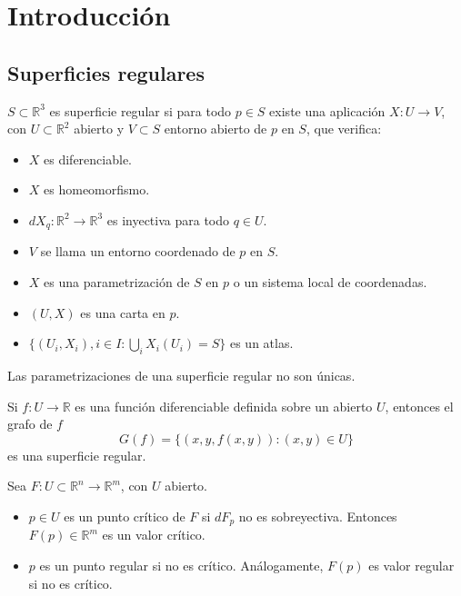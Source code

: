 \chapter{Introducción}
\section{Superficies regulares}

\begin{definition}
    $S \subset \mathbb{R}^3$ es superficie regular si para todo $p \in S$ existe una aplicación $X : U \to V$, con $U \subset \mathbb{R}^2$ abierto y $V \subset S$ entorno abierto de $p$ en $S$, que verifica:
    \begin{itemize}
        \item $X$ es diferenciable.
        \item $X$ es homeomorfismo.
        \item $dX_q : \mathbb{R}^2 \to \mathbb{R}^3$ es inyectiva para todo $q \in U$.
    \end{itemize}
\end{definition}

\begin{definition}
    \hfill
    \begin{itemize}
        \item $V$ se llama un entorno coordenado de $p$ en $S$.
        \item $X$ es una parametrización de $S$ en $p$ o un sistema local de coordenadas.
        \item $(U, X)$ es una carta en $p$.
        \item $\{ (U_i, X_i), i \in I : \bigcup_i X_i(U_i) = S \}$ es un atlas.
    \end{itemize}
\end{definition}

\begin{remark}
    Las parametrizaciones de una superficie regular no son únicas.
\end{remark}

\begin{proposition}
    Si $f : U \to \mathbb{R}$ es una función diferenciable definida sobre un abierto $U$, entonces el grafo de $f$
    $$G(f) = \{ (x, y, f(x, y)) : (x, y) \in U \}$$
    es una superficie regular.
\end{proposition}

\begin{definition}
    Sea $F : U \subset \mathbb{R}^n \to \mathbb{R}^m$, con $U$ abierto.
    \begin{itemize}
        \item $p \in U$ es un punto crítico de $F$ si $dF_p$ no es sobreyectiva. Entonces $F(p) \in \mathbb{R}^m$ es un valor crítico.
        \item $p$ es un punto regular si no es crítico. Análogamente, $F(p)$ es valor regular si no es crítico.
    \end{itemize}
\end{definition}

